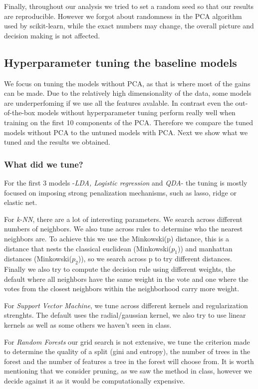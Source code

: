 \documentclass{article}
\begin{document}
Finally, throughout our analysis we tried to set a random seed so that our results are reproducible. However we forgot about randomness in the PCA algorithm used by scikit-learn, while the exact numbers may change, the overall picture and decision making is not affected.

\subsection*{Hyperparameter tuning the baseline models}
We focus on tuning the models without PCA, as that is where most of the gains can be made. Due to the relatively high dimensionality of the
data, some models are underperfoming if we use all the features avalable. In contrast even the out-of-the-box models without hyperparameter tuning 
perform really well when training on the first 10 components of the PCA. Therefore we compare the tuned models without PCA to the untuned models with PCA. 
Next we show what we tuned and the results we obtained.

\subsubsection*{What did we tune?}

For the first 3 models -\textit{LDA, Logistic regression} and \textit{QDA}- the tuning is mostly focused on imposing strong penalization mechanisms, such as lasso, ridge or elastic net.

For \textit{k-NN}, there are a lot of interesting parameters. We search across different numbers of neighbors. We also tune across rules to determine who the nearest
neighbors are. To achieve this we use the Minkowski(p) distance, this is a distance that nests the classical euclidean (Minkowski($p_1$)) and manhattan distances (Minkowski($p_2$)), so we search across p to try different distances.
Finally we also try to compute the decision rule using different weights, the default where all neighbors have the same weight in the vote and one where the votes from the closest neighbors within the neighborhood carry more weight.

For \textit{Support Vector Machine}, we tune across different kernels and regularization strenghts. 
The default uses the radial/gaussian kernel, we also try to use linear kernels as well as some others we haven't seen in class.

For \textit{Random Forests} our grid search is not extensive, we tune the criterion made to determine the quality of a split (gini and entropy), the number of trees in the forest and the number of features a tree in the forest will choose from.
It is worth mentioning that we consider pruning, as we saw the method in class, however we decide against it as it would be computationally expensive.
\end{document}
